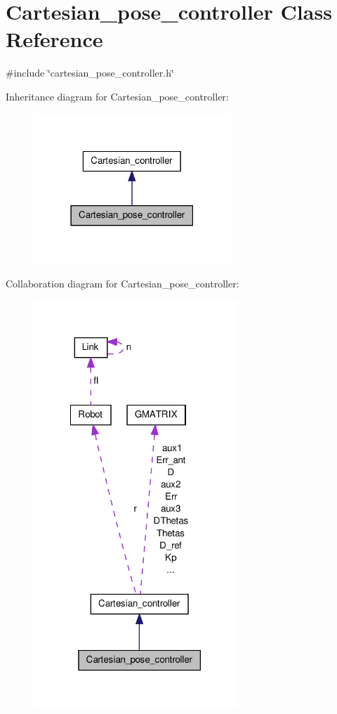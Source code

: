 \hypertarget{classCartesian__pose__controller}{\section{Cartesian\-\_\-pose\-\_\-controller Class Reference}
\label{classCartesian__pose__controller}
}


{\ttfamily \#include \char`\"{}cartesian\-\_\-pose\-\_\-controller.\-h\char`\"{}}



Inheritance diagram for Cartesian\-\_\-pose\-\_\-controller\-:\nopagebreak
\begin{figure}[H]
\begin{center}
\leavevmode
\includegraphics[width=210pt]{classCartesian__pose__controller__inherit__graph}
\end{center}
\end{figure}


Collaboration diagram for Cartesian\-\_\-pose\-\_\-controller\-:\nopagebreak
\begin{figure}[H]
\begin{center}
\leavevmode
\includegraphics[width=218pt]{classCartesian__pose__controller__coll__graph}
\end{center}
\end{figure}
